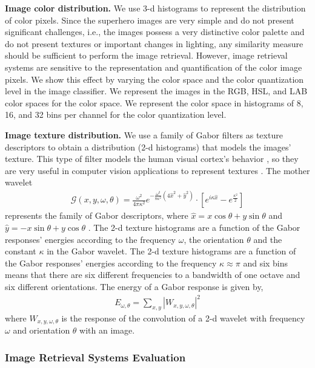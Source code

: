 \textbf{Image color distribution.} We use 3-d histograms to represent the distribution of color pixels. Since the superhero images are very simple and do not present significant challenges, i.e., the images possess a very distinctive color palette and do not present textures or important changes in lighting, any similarity measure should be sufficient to perform the image retrieval. However, image retrieval systems are sensitive to the representation and quantification of the color image pixels. We show this effect by varying the color space and the color quantization level in the image classifier. We represent the images in the RGB, HSL, and LAB color spaces for the color space. We represent the color space in histograms of 8, 16, and 32 bins per channel for the color quantization level.

\textbf{Image texture distribution.} We use a family of Gabor filters as texture descriptors to obtain a distribution (2-d histograms) that models the images' texture. This type of filter models the human visual cortex's behavior \citep{Daugman:TASSP:1988}, so they are very useful in computer vision applications to represent textures \citep{Lee:PAMI:1996}. The mother wavelet
\begin{eqnarray}
 \mathcal{G}(x,y,\omega,\theta) = \frac{\omega^2}{4\pi\kappa^2} e^{-\frac{\omega^2}{8\kappa^2}\left(4\hat{x}^2 + \hat{y}^2\right)} \cdot [e ^{i \kappa \hat{x}} -e ^ {\frac{\kappa ^ 2}{2}} ]  \label{eq:gabor_filters}
\end{eqnarray}
represents the family of Gabor descriptors, where $\hat{x} = x \cos \theta +  y \sin \theta$ and $\hat{y} = -x\sin \theta + y \cos \theta$ . The 2-d texture histograms are a function of the Gabor responses' energies according to the frequency $\omega$, the orientation $\theta$ and the constant $\kappa$ in the Gabor wavelet. The 2-d texture histograms are a function of the Gabor responses' energies according to the frequency  $\kappa \approx \pi$ and six bins means that there are six different frequencies to a bandwidth of one octave and six different orientations. The energy of a Gabor response is given by, 
\begin{eqnarray} 
 E_{\omega,\theta} = \sum\nolimits_{x, y}|W_{x,y,\omega,\theta}|^2 \label{eq:g_energy}
\end{eqnarray}
where $W_{x,y,\omega,\theta}$ is the response of the convolution of a 2-d wavelet with frequency $\omega$ and orientation $\theta$ with an image. 

\subsubsection{Image Retrieval Systems Evaluation} \label{subsubsec:evaluation}

